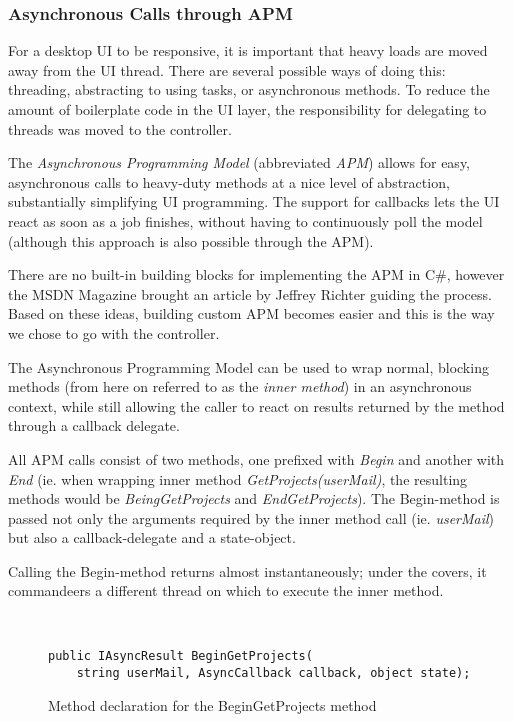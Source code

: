 \subsubsection{Asynchronous Calls through APM}
\label{sec:APM}

For a desktop UI to be responsive, it is important that heavy loads are moved away from the UI thread.
There are several possible ways of doing this: threading, abstracting to using tasks, or asynchronous
methods. To reduce the amount of boilerplate code in the UI layer, the responsibility for delegating
to threads was moved to the controller.

The \emph{Asynchronous Programming Model}\cite{msdnAPMdoc} (abbreviated \emph{APM}) allows for easy,
asynchronous calls to heavy-duty methods at a nice level of abstraction, substantially simplifying UI
programming. The support for callbacks lets the UI react as soon as a job finishes, without having to
continuously poll the model (although this approach is also possible through the APM).

There are no built-in building blocks for implementing the APM in C\#, however the MSDN Magazine\cite{richtermsdn0307}
brought an article by Jeffrey Richter guiding the process. Based on these ideas, building custom APM becomes easier and
this is the way we chose to go with the controller.

The Asynchronous Programming Model can be used to wrap normal, blocking methods (from here on referred to as
the \emph{inner method}) in an asynchronous context, while still allowing the caller to react on results
returned by the method through a callback delegate.

All APM calls consist of two methods, one prefixed with \emph{Begin} and another with \emph{End} (ie.
when wrapping inner method \emph{GetProjects(userMail)}, the resulting methods would be \emph{BeingGetProjects}
and \emph{EndGetProjects}). The Begin-method is passed not only the arguments required by the inner method call
(ie. \emph{userMail}) but also a callback-delegate and a state-object.

Calling the Begin-method returns almost instantaneously; under the covers, it commandeers a different thread
on which to execute the inner method.

\begin{figure}[hbt]
    \begin{verbatim}
    
    
public IAsyncResult BeginGetProjects(
    string userMail, AsyncCallback callback, object state);\end{verbatim}
    \caption{Method declaration for the BeginGetProjects method}
    \label{fig:begingetprojectscode}
\end{figure}

